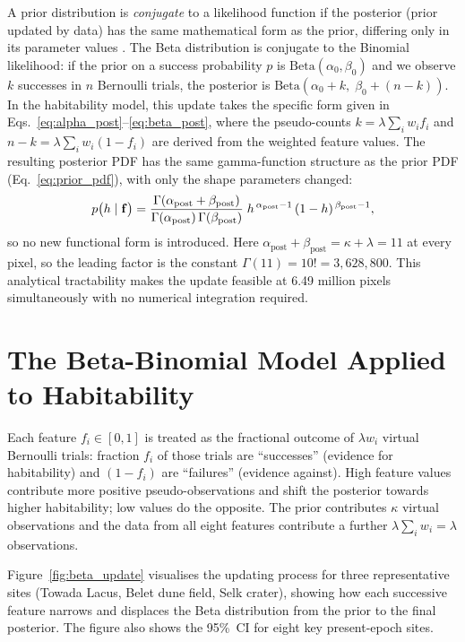A prior distribution is \textit{conjugate} to a likelihood function if the
posterior (prior updated by data) has the same mathematical form as the
prior, differing only in its parameter values \citep[ch.~2]{Gelman2013}.  The Beta distribution is
conjugate to the Binomial likelihood: if the prior on a success probability
$p$ is $\mathrm{Beta}(\alpha_0, \beta_0)$ and we observe $k$ successes
in $n$ Bernoulli trials, the posterior is
$\mathrm{Beta}(\alpha_0 + k,\; \beta_0 + (n - k))$.
In the habitability model, this update takes the specific form given in
Eqs.~\ref{eq:alpha_post}--\ref{eq:beta_post}, where the pseudo-counts
$k = \lambda\sum_i w_i f_i$ and $n - k = \lambda\sum_i w_i(1-f_i)$ are
derived from the weighted feature values.  The resulting posterior PDF has
the same gamma-function structure as the prior PDF (Eq.~\ref{eq:prior_pdf}),
with only the shape parameters changed:
\begin{equation}
  p\bigl(h \mid \mathbf{f}\bigr)
  = \frac{\Gamma(\alpha_\text{post} + \beta_\text{post})}{\Gamma(\alpha_\text{post})\,\Gamma(\beta_\text{post})}\;
  h^{\,\alpha_\text{post} - 1}\,(1 - h)^{\,\beta_\text{post} - 1} ,
  \label{eq:posterior_pdf}
\end{equation}
so no new functional form is introduced.  Here $\alpha_\text{post} +
\beta_\text{post} = \kappa + \lambda = 11$ at every pixel, so the leading
factor is the constant $\Gamma(11) = 10! = 3{,}628{,}800$.
This analytical tractability makes the update feasible at 6.49 million
pixels simultaneously with no numerical integration required.

\section{The Beta-Binomial Model Applied to Habitability}
\label{sec:beta_binom_detail}

Each feature $f_i \in [0, 1]$ is treated as the fractional outcome of
$\lambda w_i$ virtual Bernoulli trials: fraction $f_i$ of those trials are
``successes'' (evidence for habitability) and $(1 - f_i)$ are ``failures''
(evidence against).  High feature values contribute more positive
pseudo-observations and shift the posterior towards higher habitability;
low values do the opposite.  The prior contributes $\kappa$ virtual
observations and the data from all eight features contribute a further
$\lambda \sum_i w_i = \lambda$ observations.

Figure~\ref{fig:beta_update} visualises the updating process for three
representative sites (Towada Lacus, Belet dune field, Selk crater),
showing how each successive feature narrows and displaces the Beta
distribution from the prior to the final posterior.  The figure also
shows the 95\%~CI for eight key present-epoch sites.

